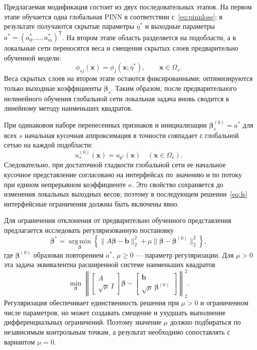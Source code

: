 \documentclass{misisarticle}
\begin{document}
Предлагаемая модификация состоит из двух последовательных этапов. На первом этапе обучается одна глобальная PINN в соответствии с~\eqref{eq:pinnloss}; в результате получаются скрытые параметры $\eta^{\ast}$ и выходные параметры $a^{\ast}=(a_0^{\ast},\ldots,a_m^{\ast})^{\mathsf T}$. На втором этапе область разделяется на подобласти, а в локальные сети переносятся веса и смещения скрытых слоев предварительно обученной модели:
\begin{equation}
 \phi_{sj}(\mathbf{x})=
 \phi_j(\mathbf{x};\eta^{\ast}),
 \qquad \mathbf{x}\in\Omega_s.
\label{eq:transfer}
\end{equation}
Веса скрытых слоев на втором этапе остаются фиксированными; оптимизируются только выходные коэффициенты $\boldsymbol\beta_s$. Таким образом, после предварительного нелинейного обучения глобальной сети локальная задача вновь сводится к линейному методу наименьших квадратов.

При одинаковом наборе перенесенных признаков и инициализации $\boldsymbol\beta_s^{(0)}=a^{\ast}$ для всех $s$ начальная кусочная аппроксимация в точности совпадает с глобальной сетью на каждой подобласти:
\begin{equation}
 u_s^{(0)}(\mathbf{x})=u_{\theta^{\ast}}(\mathbf{x})
 \quad(\mathbf{x}\in\Omega_s).
\label{eq:initialidentity}
\end{equation}
Следовательно, при достаточной гладкости глобальной сети ее начальное кусочное представление согласовано на интерфейсах по значению и по потоку при едином непрерывном коэффициенте $\kappa$. Это свойство сохраняется до изменения локальных выходных весов; поэтому в последующем решении~\eqref{eq:ls} интерфейсные ограничения должны быть включены явно.

Для ограничения отклонения от предварительно обученного представления предлагается исследовать регуляризованную постановку
\begin{equation}
 \boldsymbol\beta^{\ast}=\operatorname*{arg\,min}_{\boldsymbol\beta}
 \left\{\|A\boldsymbol\beta-\mathbf b\|_2^2
 +\mu\|\boldsymbol\beta-\boldsymbol\beta^{(0)}\|_2^2\right\},
\label{eq:regularized}
\end{equation}
где $\boldsymbol\beta^{(0)}$ образован повторением $a^{\ast}$, $\mu\geq0$ --- параметр регуляризации. Для $\mu>0$ эта задача эквивалентна расширенной системе наименьших квадратов
\begin{equation}
 \min_{\boldsymbol\beta}\left\|
 \begin{bmatrix}A\\\sqrt\mu\,I\end{bmatrix}
 \boldsymbol\beta-
 \begin{bmatrix}\mathbf b\\\sqrt\mu\,\boldsymbol\beta^{(0)}\end{bmatrix}
 \right\|_2^2.
\label{eq:augmented}
\end{equation}
Регуляризация обеспечивает единственность решения при $\mu>0$ и ограниченном числе параметров, но может создавать смещение и ухудшать выполнение дифференциальных ограничений. Поэтому значение $\mu$ должно подбираться по независимым контрольным точкам, а результат необходимо сопоставлять с вариантом $\mu=0$.
\end{document}
